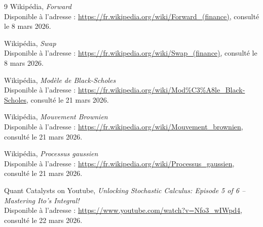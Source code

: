\begin{thebibliography}{9}
    Wikipédia, \emph{Forward}\\
    Disponible à l'adresse :  
    \url{https://fr.wikipedia.org/wiki/Forward_(finance)}, 
    consulté le 8 mars 2026.

    Wikipédia, \emph{Swap}\\
    Disponible à l'adresse :  
    \url{https://fr.wikipedia.org/wiki/Swap_(finance)}, 
    consulté le 8 mars 2026.

    Wikipédia, \emph{Modèle de Black-Scholes}\\
    Disponible à l'adresse :  
    \url{https://fr.wikipedia.org/wiki/Mod%C3%A8le_Black-Scholes}, 
    consulté le 21 mars 2026.

    Wikipédia, \emph{Mouvement Brownien}\\
    Disponible à l'adresse :  
    \url{https://fr.wikipedia.org/wiki/Mouvement_brownien}, 
    consulté le 21 mars 2026.

    Wikipédia, \emph{Processus gaussien}\\
    Disponible à l'adresse :  
    \url{https://fr.wikipedia.org/wiki/Processus_gaussien}, 
    consulté le 21 mars 2026.

    Quant Catalysts on Youtube, \emph{Unlocking Stochastic Calculus: Episode 5 of 6 – Mastering Ito’s Integral!}\\
    Disponible à l'adresse :  
    \url{https://www.youtube.com/watch?v=Nfo3_wIWpd4}, 
    consulté le 22 mars 2026.


\end{thebibliography}









